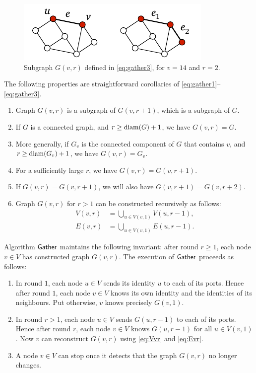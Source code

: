 \begin{figure}
    \centering
    \includegraphics[page=\PGather]{figs.pdf}
    \caption{Subgraph $G(v,r)$ defined in \eqref{eq:gather3}, for $v = 14$ and $r = 2$.}\label{fig:gather}
\end{figure}

The following properties are straightforward corollaries of \eqref{eq:gather1}--\eqref{eq:gather3}.
\begin{enumerate}
    \item Graph $G(v,r)$ is a subgraph of $G(v,r+1)$, which is a subgraph of $G$.
    \item If $G$ is a connected graph, and $r \ge \operatorname{diam}(G) + 1$, we have $G(v,r) = G$.
    \item More generally, if $G_v$ is the connected component of $G$ that contains $v$, and $r \ge \operatorname{diam}(G_v) + 1$, we have $G(v,r) = G_v$.
    \item For a sufficiently large $r$, we have $G(v,r) = G(v,r+1)$.
    \item If $G(v,r) = G(v,r+1)$, we will also have $G(v,r+1) = G(v,r+2)$.
    \item Graph $G(v,r)$ for $r > 1$ can be constructed recursively as follows:
    \begin{align}
        V(v,r) &= \bigcup_{u \in V(v,1)} V(u,r-1), \label{eq:Vvr} \\
        E(v,r) &= \bigcup_{u \in V(v,1)} E(u,r-1). \label{eq:Evr}
    \end{align}
\end{enumerate} 

Algorithm $\textsf{Gather}$ maintains the following invariant: after round $r \ge 1$, each node $v \in V$ has constructed graph $G(v,r)$. The execution of $\textsf{Gather}$ proceeds as follows:
\begin{enumerate}
    \item In round $1$, each node $u \in V$ sends its identity $u$ to each of its ports. Hence after round $1$, each node $v \in V$ knows its own identity and the identities of its neighbours. Put otherwise, $v$ knows precisely $G(v,1)$.
    \item In round $r > 1$, each node $u \in V$ sends $G(u,r-1)$ to each of its ports. Hence after round $r$, each node $v \in V$ knows $G(u,r-1)$ for all $u \in V(v,1)$. Now $v$ can reconstruct $G(v,r)$ using \eqref{eq:Vvr} and \eqref{eq:Evr}.
    \item A node $v \in V$ can stop once it detects that the graph $G(v,r)$ no longer changes.
\end{enumerate}


